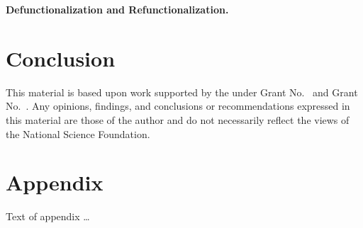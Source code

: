 \documentclass[acmsmall,review,anonymous]{acmart}\settopmatter{printfolios=true,printccs=false,printacmref=false}
\begin{document}
\textbf{Defunctionalization and Refunctionalization.}

\section{Conclusion}

\begin{acks}                            %
  This material is based upon work supported by the
   under Grant
  No.~ and Grant
  No.~.  Any opinions, findings, and
  conclusions or recommendations expressed in this material are those
  of the author and do not necessarily reflect the views of the
  National Science Foundation.
\end{acks}



\appendix
\section{Appendix}

Text of appendix \ldots
\end{document}
